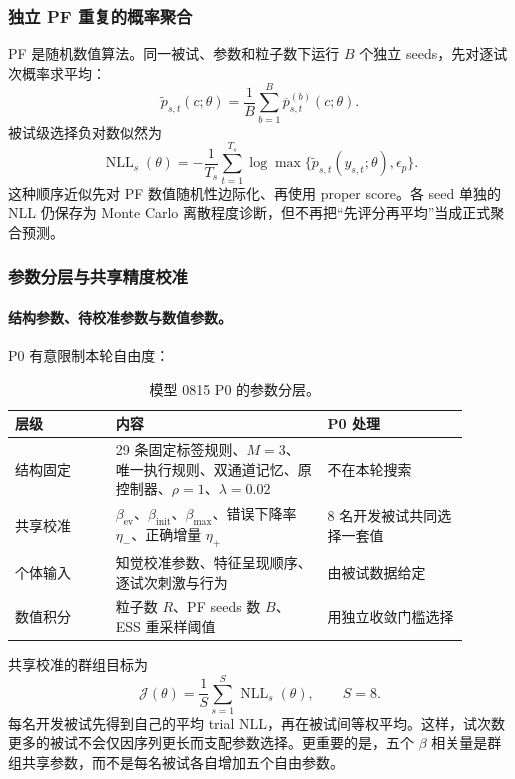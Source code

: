 \subsubsection{独立 PF 重复的概率聚合}

PF 是随机数值算法。同一被试、参数和粒子数下运行 $B$ 个独立 seeds，先对逐试次概率求平均：
\begin{equation}
\widetilde p_{s,t}(c;\theta)
=\frac{1}{B}\sum_{b=1}^{B}
\overline p_{s,t}^{(b)}(c;\theta).
\label{eq:m0815-repeat-probability}
\end{equation}
被试级选择负对数似然为
\begin{equation}
\operatorname{NLL}_s(\theta)
=-\frac{1}{T_s}\sum_{t=1}^{T_s}
\log\max\{\widetilde p_{s,t}(y_{s,t};\theta),\epsilon_p\}.
\label{eq:m0815-nll}
\end{equation}
这种顺序近似先对 PF 数值随机性边际化、再使用 proper score。各 seed 单独的 NLL 仍保存为 Monte Carlo 离散程度诊断，但不再把“先评分再平均”当成正式聚合预测。


\subsubsection{参数分层与共享精度校准}

\paragraph{结构参数、待校准参数与数值参数。}
P0 有意限制本轮自由度：
\begin{table}[htbp]
\centering
\small
\caption{模型 0815 P0 的参数分层。}
\label{tab:m0815-parameter-layers}
\begin{tabular}{p{0.20\linewidth}p{0.42\linewidth}p{0.28\linewidth}}
\hline
层级 & 内容 & P0 处理 \\
\hline
结构固定 & 29 条固定标签规则、$M=3$、唯一执行规则、双通道记忆、原控制器、$\rho=1$、$\lambda=0.02$ & 不在本轮搜索 \\
共享校准 & $\beta_{\mathrm{ev}}$、$\beta_{\mathrm{init}}$、$\beta_{\max}$、错误下降率 $\eta_-$、正确增量 $\eta_+$ & 8 名开发被试共同选择一套值 \\
个体输入 & 知觉校准参数、特征呈现顺序、逐试次刺激与行为 & 由被试数据给定 \\
数值积分 & 粒子数 $R$、PF seeds 数 $B$、ESS 重采样阈值 & 用独立收敛门槛选择 \\
\hline
\end{tabular}
\end{table}

共享校准的群组目标为
\begin{equation}
\mathcal J(\theta)
=\frac{1}{S}\sum_{s=1}^{S}\operatorname{NLL}_s(\theta),
\qquad S=8.
\label{eq:m0815-shared-objective}
\end{equation}
每名开发被试先得到自己的平均 trial NLL，再在被试间等权平均。这样，试次数更多的被试不会仅因序列更长而支配参数选择。更重要的是，五个 $\beta$ 相关量是群组共享参数，而不是每名被试各自增加五个自由参数。

